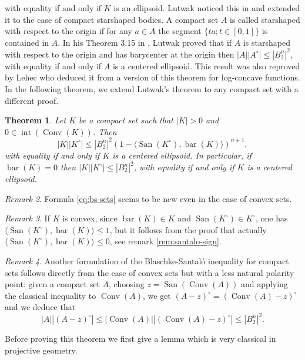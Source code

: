 \documentclass[10pt]{amsart}
\newtheorem{thm}{Theorem}[section]
\theoremstyle{definition}
\theoremstyle{remark}
\newtheorem{rem}[thm]{Remark}
\newcommand{\conv}{\operatorname{Conv}}
\newcommand{\inte}{\operatorname{int}}
\newcommand{\bary}{\operatorname{bar}}
\newcommand{\san}{\operatorname{San}}
\begin{document}
with equality if and only if $K$ is an ellipsoid.
Lutwak noticed this in \cite{L91} and extended it to the case of compact starshaped bodies. A compact set $A$ is called starshaped with respect to the origin if for any $a\in A$ the segment $\{ta; t\in[0,1]\}$ is contained in $A$. In his Theorem 3.15 in \cite{L91}, Lutwak proved that if $A$ is starshaped with respect to the origin and has barycenter at the origin then $|A||A^\circ|\le |B_2^n|^2$, with equality if and only if $A$ is a centered ellipsoid. This result was also reproved by Lehec \cite{lehec3} who deduced it from a version of this theorem for log-concave functions. In the following theorem, we extend Lutwak's theorem to any compact set with a different proof. 

\begin{thm}\label{BS-set-gen}
Let $K$ be a compact set such that $|K|>0$ and $0\in \inte(\conv(K))$. Then 
\begin{equation}\label{eq:bs-sets}
|K||K^\circ|\le|B_2^n|^2(1-\langle \san(K^\circ),\bary(K)\rangle)^{n+1},
\end{equation}
with equality if and only if $K$ is a centered ellipsoid.
In particular, if $\bary(K)=0$ then $|K||K^\circ|\le|B_2^n|^2$, with equality if and only if $K$ is a centered ellipsoid.
\end{thm}

\begin{rem}\label{rem:santalo-sets-new}
 Formula \eqref{eq:bs-sets} seems to be new even in the case of convex sets. 
\end{rem}
\begin{rem}\label{rem:santalo-sets-sign} If $K$ is convex, since $\bary(K)\in K$  and $\san(K^\circ)\in K^\circ$, one has $\langle \san(K^\circ),\bary(K)\rangle\le1$, but it follows from the proof that actually $\langle \san(K^\circ),\bary(K)\rangle\le0$, see remark \ref{rem:santalo-sign}.
\end{rem}
\begin{rem}\label{rem:santalo-sets-other} Another formulation of the Blaschke-Santal\'o inequality for compact sets follows directly from the case of convex sets but with a less natural polarity point: given a compact set $A$, choosing $z=\san(\conv(A))$ and applying the classical inequality to $\conv(A)$, we get $(A-z)^\circ=(\conv(A)-z)^\circ$ and we deduce that
\[
|A||(A-z)^\circ|\le |\conv(A)||(\conv(A)-z)^\circ|\le|B_2^n|^2.
\]
\end{rem}
Before proving this theorem we first give a lemma which is very classical in projective geometry.
\end{document}
